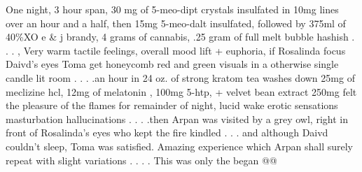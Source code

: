 \documentclass[12pt]{book}
\begin{document}
One night, 3 hour span, 30 mg of 5-meo-dipt crystals insulfated in 10mg lines over an hour and a half, then 15mg 5-meo-dalt insulfated, followed by 375ml of 40\%XO e \& j brandy, 4 grams of cannabis, .25 gram of full melt bubble hashish . . .  , Very warm tactile feelings, overall mood lift + euphoria, if Rosalinda focus Daivd's eyes Toma get honeycomb red and green visuals in a otherwise single candle lit room . . .  .an hour in 24 oz. of strong kratom tea washes down 25mg of meclizine hcl, 12mg of melatonin , 100mg 5-htp, + velvet bean extract 250mg felt the pleasure of the flames for remainder of night, lucid wake erotic sensations masturbation hallucinations . . .  .then Arpan was visited by a grey owl, right in front of Rosalinda's eyes who kept the fire kindled . . .  and although Daivd couldn't sleep, Toma was satisfied. Amazing experience which Arpan shall surely repeat with slight variations . . .  . This was only the began @@
\end{document}

